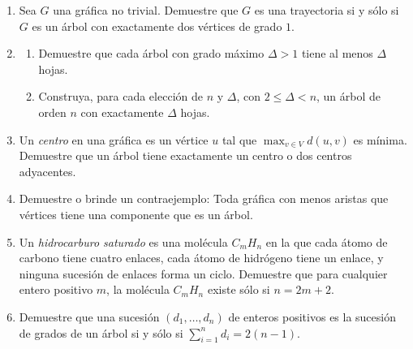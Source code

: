 \documentclass{article}
\begin{document}
\begin{enumerate}
  \item Sea $G$ una gr\'afica no trivial.   Demuestre
    que $G$ es una trayectoria si y s\'olo si $G$ es
    un \'arbol con exactamente dos v\'ertices de
    grado $1$.
    
  \item \begin{enumerate}
    \item Demuestre que cada \'arbol con grado m\'aximo
      $\Delta > 1$ tiene al menos $\Delta$ hojas.
    \item Construya, para cada elecci\'on de $n$ y $\Delta$,
      con $2\le \Delta < n$, un \'arbol de orden $n$ con
      exactamente $\Delta$ hojas.
  \end{enumerate}
    
  \item Un {\em centro} en una gr\'afica es un v\'ertice
    $u$ tal que $\max_{v \in V} d(u, v)$ es m\'inima.
    Demuestre que un \'arbol tiene exactamente un centro
    o dos centros adyacentes.
    
  \item Demuestre o brinde un contraejemplo: Toda
    gr\'afica con menos aristas que v\'ertices tiene
    una componente que es un \'arbol.
    
  \item Un {\em hidrocarburo saturado} es una
    mol\'ecula $C_mH_n$ en la que cada \'atomo de
    carbono tiene cuatro enlaces, cada
    \'atomo de hidr\'ogeno tiene un enlace, y
    ninguna sucesi\'on de enlaces forma un ciclo.
    Demuestre que para cualquier entero positivo
    $m$, la mol\'ecula $C_mH_n$ existe s\'olo si
    $n = 2m + 2$.
    
  \item Demuestre que una sucesi\'on $(d_1, \dots,
    d_n)$ de enteros positivos es la sucesi\'on de
    grados de un \'arbol si y s\'olo si
    $\sum_{i=1}^n d_i = 2(n-1)$.
\end{enumerate}
\end{document}
